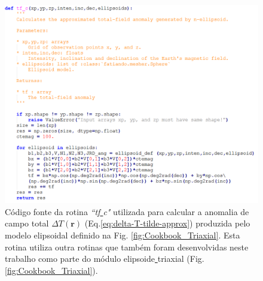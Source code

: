 \begin{figure}[hbt!]
	\centering \includegraphics[width=16 cm,height=14 cm]{figures/func_triaxial}
	\caption[Código fonte da rotina \textit{``tf\underline{ }c"} utilizada para calcular a anomalia de campo total $\Delta T (\mathbf{r})$ (Eq.\ref{eq:delta-T-tilde-approx}) produzida pelo modelo elipsoidal definido na Fig. \ref{fig:Cookbook_Triaxial}. Esta rotina utiliza outra rotinas que também foram desenvolvidas neste trabalho como parte do módulo elipsoide\underline{ }triaxial (Fig. \ref{fig:Cookbook_Triaxial}).]{Código fonte da rotina \textit{``tf\underline{ }c"} utilizada para calcular a anomalia de campo total $\Delta T (\mathbf{r})$ (Eq.\ref{eq:delta-T-tilde-approx}) produzida pelo modelo elipsoidal definido na Fig. \ref{fig:Cookbook_Triaxial}. Esta rotina utiliza outra rotinas que também foram desenvolvidas neste trabalho como parte do módulo elipsoide\underline{ }triaxial (Fig. \ref{fig:Cookbook_Triaxial}).}
	\label{fig:func_triaxial}
\end{figure}

